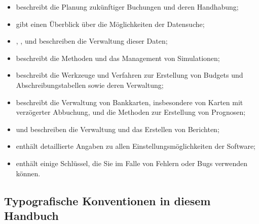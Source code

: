 \begin{itemize}
	\item {} beschreibt die Planung zukünftiger Buchungen und deren Handhabung;%
	\item {} gibt einen Überblick über die Möglichkeiten der Datensuche;%
	\item {}, ,  und  beschreiben die Verwaltung dieser Daten;%
	\item {} beschreibt die Methoden und das Management von Simulationen;%
	\item {} beschreibt die Werkzeuge und Verfahren zur Erstellung von Budgets und Abschreibungstabellen sowie deren Verwaltung;%
	\item {} beschreibt die Verwaltung von Bankkarten, insbesondere von Karten mit verzögerter Abbuchung, und die Methoden zur Erstellung von Prognosen;%
	\item {} und  beschreiben die Verwaltung und das Erstellen von Berichten;%
	\item {} enthält detaillierte Angaben zu allen Einstellungsmöglichkeiten der Software;%
	\item {} enthält einige Schlüssel, die Sie im Falle von Fehlern oder Bugs verwenden können.%
\end{itemize}


\subsection{Typografische Konventionen in diesem Handbuch\label{introduction-manual-conventions}}

